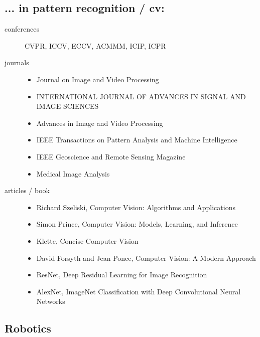 \documentclass{article}
\begin{document}
\subsection*{... in pattern recognition / cv:}
\begin{description}
    \item[conferences] CVPR, ICCV, ECCV, ACMMM, ICIP, ICPR
    \item[journals] \hfill
    \begin{itemize}
        \item Journal on Image and Video Processing
        \item INTERNATIONAL JOURNAL OF ADVANCES IN SIGNAL AND IMAGE SCIENCES
        \item Advances in Image and Video Processing
        \item IEEE Transactions on Pattern Analysis and Machine Intelligence
        \item IEEE Geoscience and Remote Sensing Magazine
        \item Medical Image Analysis
    \end{itemize}
    \item[articles / book] \hfill
    \begin{itemize}
        \item Richard Szeliski, Computer Vision: Algorithms and Applications
        \item Simon Prince, Computer Vision: Models, Learning, and Inference
        \item Klette, Concise Computer Vision
        \item David Forsyth and Jean Ponce, Computer Vision: A Modern Approach
        \item ResNet, Deep Residual Learning for Image Recognition
        \item AlexNet, ImageNet Classification with Deep Convolutional Neural Networks
    \end{itemize} 
\end{description}
\subsection*{Robotics}
\end{document}
